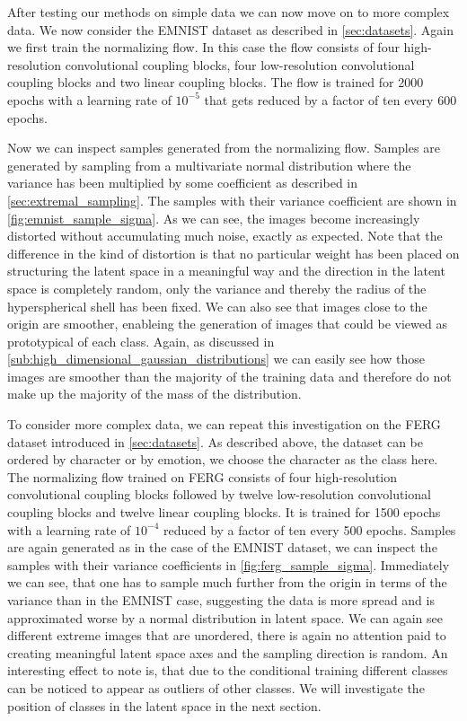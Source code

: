After testing our methods on simple data we can now move on to more complex
data. We now consider the EMNIST dataset as described in
\autoref{sec:datasets}. Again we first train the normalizing flow. In this case
the flow consists of four high-resolution convolutional coupling blocks, four
low-resolution convolutional coupling blocks and two linear coupling blocks.
The flow is trained for 2000 epochs with a learning rate of $10^{-5}$ that gets
reduced by a factor of ten every 600 epochs.

Now we can inspect samples generated from the normalizing flow. Samples are
generated by sampling from a multivariate normal distribution where the
variance has been multiplied by some coefficient as described in
\autoref{sec:extremal_sampling}. The samples with their variance coefficient
are shown in \autoref{fig:emnist_sample_sigma}. As we can see, the images
become increasingly distorted without accumulating much noise, exactly as
expected. Note that the difference in the kind of distortion is that no
particular weight has been placed on structuring the latent space in a
meaningful way and the direction in the latent space is completely random, only
the variance and thereby the radius of the hyperspherical shell has been fixed.
We can also see that images close to the origin are smoother, enableing the
generation of images that could be viewed as prototypical of each class. Again,
as discussed in \autoref{sub:high_dimensional_gaussian_distributions} we can
easily see how those images are smoother than the majority of the training data
and therefore do not make up the majority of the mass of the distribution.

To consider more complex data, we can repeat this investigation on the FERG
dataset introduced in \autoref{sec:datasets}. As described above, the dataset
can be ordered by character or by emotion, we choose the character as the class
here. The normalizing flow trained on FERG consists of four high-resolution
convolutional coupling blocks followed by twelve low-resolution convolutional
coupling blocks and twelve linear coupling blocks. It is trained for 1500
epochs with a learning rate of $10^{-4}$ reduced by a factor of ten every 500
epochs. Samples are again generated as in the case of the EMNIST dataset, we
can inspect the samples with their variance coefficients in
\autoref{fig:ferg_sample_sigma}. Immediately we can see, that one has to sample
much further from the origin in terms of the variance than in the EMNIST case,
suggesting the data is more spread and is approximated worse by a normal
distribution in latent space. We can again see different extreme images that
are unordered, there is again no attention paid to creating meaningful
latent space axes and the sampling direction is random. An interesting effect
to note is, that due to the conditional training different classes can be
noticed to appear as outliers of other classes. We will investigate the
position of classes in the latent space in the next section.

